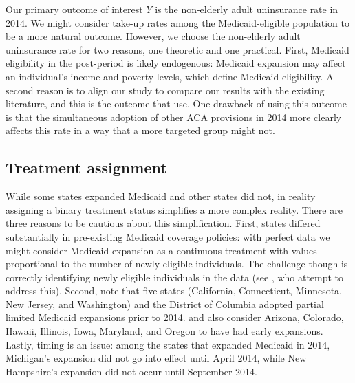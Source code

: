 \documentclass[12pt]{article}
\begin{document}
Our primary outcome of interest $Y$ is the non-elderly adult uninsurance rate in 2014. We might consider take-up rates among the Medicaid-eligible population to be a more natural outcome. However, we choose the non-elderly adult uninsurance rate for two reasons, one theoretic and one practical. First, Medicaid eligibility in the post-period is likely endogenous: Medicaid expansion may affect an individual's income and poverty levels, which define Medicaid eligibility. A second reason is to align our study to compare our results with the existing literature, and this is the outcome that \cite{courtemanche2017early} use. One drawback of using this outcome is that the simultaneous adoption of other ACA provisions in 2014 more clearly affects this rate in a way that a more targeted group might not.

\subsection{Treatment assignment}

While some states expanded Medicaid and other states did not, in reality assigning a binary treatment status simplifies a more complex reality. There are three reasons to be cautious about this simplification. First, states differed substantially in pre-existing Medicaid coverage policies: with perfect data we might consider Medicaid expansion as a continuous treatment with values proportional to the number of newly eligible individuals. The challenge though is correctly identifying newly eligible individuals in the data (see \cite{frean2017premium}, who attempt to address this). Second, \cite{frean2017premium} note that five states (California, Connecticut, Minnesota, New Jersey, and Washington) and the District of Columbia adopted partial limited Medicaid expansions prior to 2014. \cite{kaestner2017effects} and \cite{courtemanche2017early} also consider Arizona, Colorado, Hawaii, Illinois, Iowa, Maryland, and Oregon to have had early expansions. Lastly, timing is an issue: among the states that expanded Medicaid in 2014, Michigan's expansion did not go into effect until April 2014, while New Hampshire's expansion did not occur until September 2014.
\end{document}
